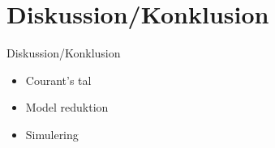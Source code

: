  \section{Diskussion/Konklusion}



\begin{frame}{Diskussion/Konklusion}{}
	\vfill \vfill\centering
	\begin{itemize}
			\item Courant's tal
			\item Model reduktion
	    	\item Simulering
	\end{itemize}    

	\vfill \vfill
\end{frame}
